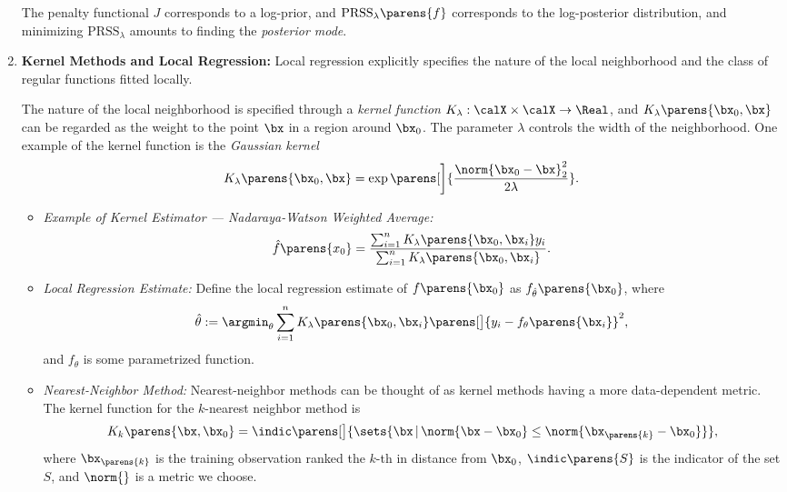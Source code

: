 \documentclass[12pt]{article}
\begin{document}
\begin{enumerate}[label=\textbf{\arabic*.}]
	The penalty functional $J$ corresponds to a log-prior, and $\mathrm{PRSS}_{\lambda} \parens{f}$ corresponds to the log-posterior distribution, and minimizing $\mathrm{PRSS}_{\lambda}$ amounts to finding the \textit{posterior mode}. 
	
	\item \textbf{Kernel Methods and Local Regression:} Local regression explicitly specifies the nature of the local neighborhood and the class of regular functions fitted locally. 
	
	The nature of the local neighborhood is specified through a \emph{kernel function} $K_{\lambda}: \calX \times \calX \to \Real$, and $K_{\lambda} \parens{\bx_0, \bx}$ can be regarded as the weight to the point $\bx$ in a region around $\bx_0$. The parameter $\lambda$ controls the width of the neighborhood. One example of the kernel function is the \emph{Gaussian kernel} 
	\begin{align*}
		K_{\lambda} \parens{\bx_0, \bx} = \exp \parens[\bigg]{\frac{\norm{\bx_0 - \bx}_2^2}{2 \lambda}}. 
	\end{align*}
	
	\begin{itemize}
	\item \textit{Example of Kernel Estimator --- Nadaraya-Watson Weighted Average:} 
	\begin{align}
		\hat{f} \parens{x_0} = \frac{\sum_{i=1}^n K_{\lambda} \parens{\bx_0, \bx_i} y_i}{\sum_{i=1}^n K_{\lambda} \parens{\bx_0, \bx_i}}. 
	\end{align}
	
	\item \textit{Local Regression Estimate:} Define the local regression estimate of $f \parens{\bx_0}$ as $f_{\hat{\theta}} \parens{\bx_0}$, where 
	\begin{align}
		\hat{\theta} := \argmin_{\theta} \sum_{i=1}^n K_{\lambda} \parens{\bx_0, \bx_i} \parens[\big]{y_i - f_{\theta} \parens{\bx_i}}^2, 
	\end{align}
	and $f_{\theta}$ is some parametrized function. 
	
	\item \textit{Nearest-Neighbor Method:} Nearest-neighbor methods can be thought of as kernel methods having a more data-dependent metric. The kernel function for the $k$-nearest neighbor method is 
	\begin{align}
		K_{k} \parens{\bx, \bx_0} = \indic \parens[\big]{ \sets{\bx \,\vert\, \norm{\bx - \bx_0} \le \norm{\bx_{ \parens{k} } - \bx_0}}}, 
	\end{align}
	where $\bx_{\parens{k}}$ is the training observation ranked the $k$-th in distance from $\bx_0$, $\indic \parens{S}$ is the indicator of the set $S$, and $\norm{}$ is a metric we choose.  
	\end{itemize}
	

\end{enumerate}
\end{document}

